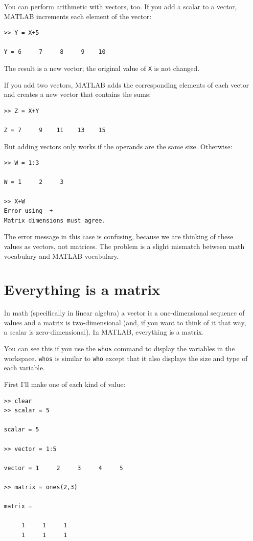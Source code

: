 \documentclass[
]{book}
\begin{document}
You can perform arithmetic with vectors, too.  If you add a scalar
to a vector, MATLAB increments each element of the vector:

\begin{verbatim}
>> Y = X+5

Y = 6     7     8     9    10
\end{verbatim}

The result is a new vector; the original value of {\tt X} is not
changed.

If you add two vectors, MATLAB adds the corresponding elements of each
vector and creates a new vector that contains the sums:

\begin{verbatim}
>> Z = X+Y

Z = 7     9    11    13    15
\end{verbatim}

But adding vectors only works if the operands are the same size.
Otherwise:

\begin{verbatim}
>> W = 1:3

W = 1     2     3

>> X+W
Error using  +
Matrix dimensions must agree.
\end{verbatim}

The error message in this case is confusing, because we are thinking
of these values as vectors, not matrices.  The problem is a slight
mismatch between math vocabulary and MATLAB vocabulary.


\section{Everything is a matrix}

In math (specifically in linear algebra) a vector is a one-dimensional
sequence of values and a matrix is two-dimensional (and, if you want
to think of it that way, a scalar is zero-dimensional).  In MATLAB,
everything is a matrix.

You can see this if you use the {\tt whos} command to display the
variables in the workspace.  {\tt whos} is similar to {\tt who} except
that it also displays the size and type of each variable.

First I'll make one of each kind of value:

\begin{verbatim}
>> clear
>> scalar = 5

scalar = 5

>> vector = 1:5

vector = 1     2     3     4     5

>> matrix = ones(2,3)

matrix =

     1     1     1
     1     1     1
\end{verbatim}
\end{document}
